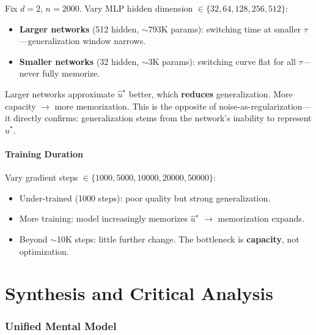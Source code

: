 \documentclass[11pt, a4paper]{article}
\theoremstyle{plain}
\theoremstyle{definition}
\theoremstyle{remark}
\begin{document}
Fix $d=2$, $n=2000$. Vary MLP hidden dimension $\in \{32, 64, 128, 256, 512\}$:
\begin{itemize}
  \item \textbf{Larger networks} (512 hidden, $\sim$793K params): switching time at smaller $\tau$---generalization window narrows.
  \item \textbf{Smaller networks} (32 hidden, $\sim$3K params): switching curve flat for all $\tau$---never fully memorize.
\end{itemize}

\begin{keybox}
Larger networks approximate $\hat{u}^\star$ better, which \textbf{reduces} generalization. More capacity $\to$ more memorization. This is the opposite of noise-as-regularization---it directly confirms: generalization stems from the network's inability to represent $\hat{u}^\star$.
\end{keybox}

\subsection{Training Duration}

Vary gradient steps $\in \{1000, 5000, 10000, 20000, 50000\}$:
\begin{itemize}
  \item Under-trained (1000 steps): poor quality but strong generalization.
  \item More training: model increasingly memorizes $\hat{u}^\star$ $\to$ memorization expands.
  \item Beyond $\sim$10K steps: little further change. The bottleneck is \textbf{capacity}, not optimization.
\end{itemize}

\part{Synthesis and Critical Analysis}

\section{Unified Mental Model}
\label{sec:unified}
\end{document}
